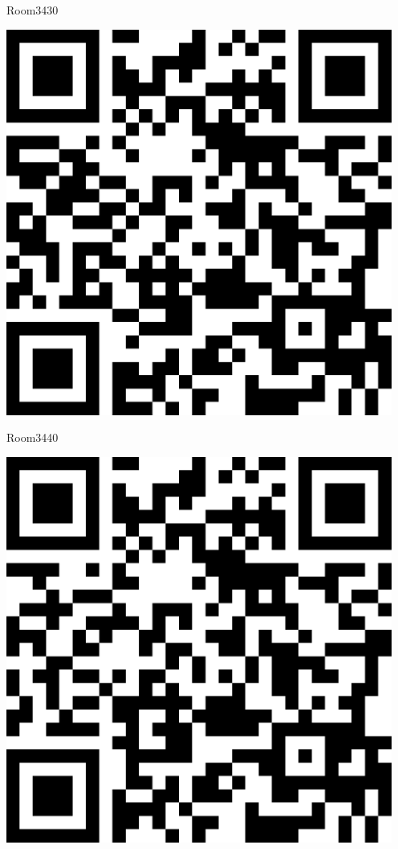 \documentclass[letterpaper]{article}
\begin{document}
 \hfill{\small Room3430} 

 \vspace{1in} 
 \pagebreak 
{} 
 \vspace*{\fill} 
 \begingroup 
 \centerline{\includegraphics[scale=1,width=5in,height=5in]{Room3440.png}} 
 \endgroup 
 \vspace*{\fill} 

 \hfill{\small Room3440} 

 \vspace{1in} 
 \pagebreak 
{} 
 \vspace*{\fill} 
 \begingroup 
 \centerline{\includegraphics[scale=1,width=5in,height=5in]{Room3441.png}} 
 \endgroup 
 \vspace*{\fill} 
\end{document}
